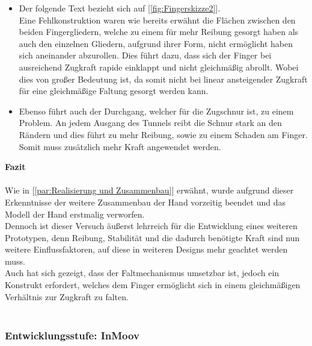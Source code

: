 \documentclass[titlepage,12pt,twoside]{article}
\begin{document}
\begin{itemize}
	\item Der folgende Text bezieht sich auf [\textcolor{blue}{\autoref{fig:Fingerskizze2}}]. \\
	Eine Fehlkonstruktion waren wie bereits erwähnt die Flächen zwischen den 
	beiden Fingergliedern, welche zu einem für mehr Reibung gesorgt haben als auch den einzelnen 
	Gliedern, aufgrund ihrer Form, nicht ermöglicht haben 
	sich aneinander abzurollen. Dies führt dazu, dass sich der Finger bei ausreichend 
	Zugkraft rapide einklappt und nicht gleichmäßig abrollt.  Wobei dies von großer 
	Bedeutung ist, da somit nicht bei linear ansteigender Zugkraft für eine 
	gleichmäßige Faltung gesorgt werden kann.
	\item Ebenso führt auch der Durchgang, welcher für die Zugschnur ist, zu 
	einem Problem. An jedem Ausgang des Tunnels reibt die Schnur stark an den 
	Rändern und dies führt zu mehr Reibung, sowie zu einem Schaden am Finger.
	Somit muss zusätzlich mehr Kraft angewendet werden.
\end{itemize}
\hfill \break
\textbf{Fazit} \\
\\
Wie in [\textcolor{blue}{\autoref{par:Realisierung und Zusammenbau}}] erwähnt, wurde aufgrund 
dieser Erkenntnisse der weitere Zusammenbau der Hand vorzeitig beendet und das 
Modell der Hand erstmalig verworfen. \\
Dennoch ist dieser Versuch äußerst lehrreich für die Entwicklung eines weiteren 
Prototypen, denn Reibung, Stabilität und die dadurch benötigte Kraft sind nun 
weitere Einflussfaktoren, auf diese in weiteren Designs mehr geachtet werden 
muss. \\
Auch hat sich gezeigt, dass der Faltmechanismus umsetzbar ist, jedoch ein Konstrukt 
erfordert, welches dem Finger ermöglicht sich in einem gleichmäßigen Verhältnis 
zur Zugkraft zu falten. \\
\\

\subsubsection{Entwicklungsstufe: InMoov}
\label{chap:Entwicklungsstufe: InMoov}
\end{document}
